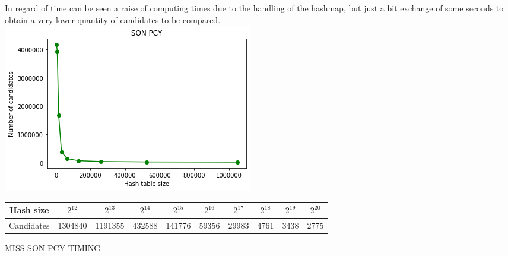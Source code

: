 \documentclass[14pt]{extarticle}
\begin{document}
In regard of time can be seen a raise of computing times due to the handling of the hashmap, but just a bit exchange of some seconds to obtain a very lower quantity of candidates to be compared.\\
\includegraphics[scale=1]{sonpcy_candidates.png}\\
\begin{center}
\hspace*{-1,5cm}
\begin{tabular}{ |c||c|c|c|c|c|c|c|c|c| } 
 \hline
 Hash size & $2^{12}$ & $2^{13}$ & $2^{14}$ & $2^{15}$ & $2^{16}$ & $2^{17}$ & $2^{18}$ & $2^{19}$ & $2^{20}$ \\
 \hline
 Candidates & 1304840 & 1191355 & 432588 & 141776 & 59356 & 29983 &  4761 & 3438 & 2775 \\
 \hline
\end{tabular}
\end{center}
MISS SON PCY TIMING\\
\end{document}
